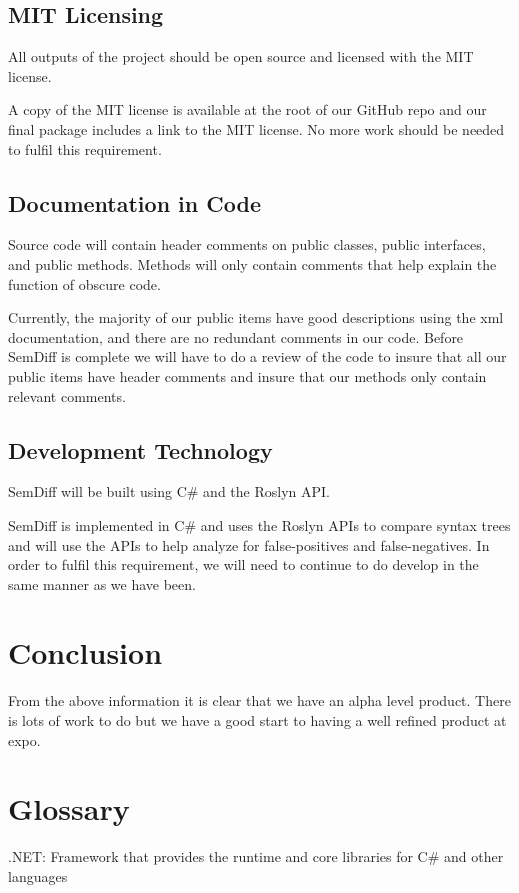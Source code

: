\documentclass[10pt,draftclsnofoot,onecolumn]{IEEEtran}
\begin{document}
\subsection{MIT Licensing}
All outputs of the project should be open source and licensed with the MIT license.

A copy of the MIT license is available at the root of our GitHub repo and our final package includes a link to the MIT license. No more work should be needed to fulfil this requirement.

\subsection{Documentation in Code}
Source code will contain header comments on public classes, public interfaces, and public methods. Methods will only contain comments that help explain the function of obscure code.

Currently, the majority of our public items have good descriptions using the xml documentation, and there are no redundant comments in our code. Before SemDiff is complete we will have to do a review of the code to insure that all our public items have header comments and insure that our methods only contain relevant comments.

\subsection{Development Technology}
SemDiff will be built using C\# and the Roslyn API.

SemDiff is implemented in C\# and uses the Roslyn APIs to compare syntax trees and will use the APIs to help analyze for false-positives and false-negatives. In order to fulfil this requirement, we will need to continue to do develop in the same manner as we have been.

\section{Conclusion}
From the above information it is clear that we have an alpha level product. There is lots of work to do but we have a good start to having a well refined product at expo.

\section{Glossary}
.NET: Framework that provides the runtime and core libraries for C\# and other languages
\end{document}
